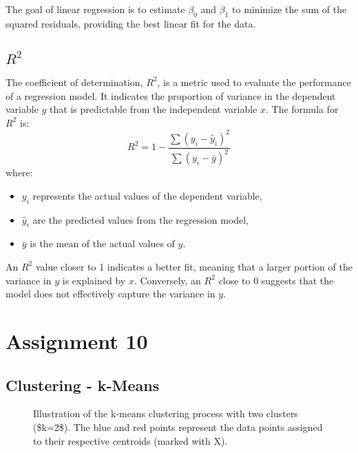 \documentclass{article}
\begin{document}
The goal of linear regression is to estimate \( \beta_0 \) and \( \beta_1 \) to minimize the sum of the squared residuals, providing the best linear fit for the data.


\subsection{$R^2$}
The coefficient of determination, \( R^2 \), is a metric used to evaluate the performance of a regression model. It indicates the proportion of variance in the dependent variable \( y \) that is predictable from the independent variable \( x \). The formula for \( R^2 \) is:
\[
R^2 = 1 - \frac{\sum (y_i - \hat{y}_i)^2}{\sum (y_i - \bar{y})^2}
\]
where:
\begin{itemize}
    \item \( y_i \) represents the actual values of the dependent variable,
    \item \( \hat{y}_i \) are the predicted values from the regression model,
    \item \( \bar{y} \) is the mean of the actual values of \( y \).
\end{itemize}

An \( R^2 \) value closer to 1 indicates a better fit, meaning that a larger portion of the variance in \( y \) is explained by \( x \). Conversely, an \( R^2 \) close to 0 suggests that the model does not effectively capture the variance in \( y \).

\section{Assignment 10}
\subsection{Clustering - k-Means}

\begin{figure}[H]
\centering
{}
\caption{Illustration of the k-means clustering process with two clusters (\$k=2\$). The blue and red points represent the data points assigned to their respective centroids (marked with X).}
\label{fig:kmeans_clusters}
\end{figure}
\end{document}
